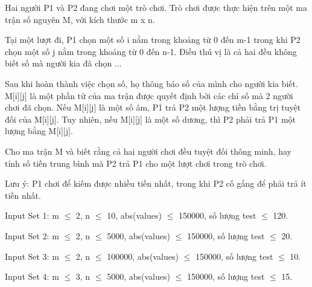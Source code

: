 Hai người P1 và P2 đang chơi một trò chơi. Trò chơi được thực hiện trên một ma trận số nguyên M, với kích thước m x n.  

   Tại một lượt đi, P1 chọn một số i nằm trong khoảng từ 0 đến m-1 trong khi P2 chọn một số j nằm trong khoảng từ 0 đến n-1. Điều thú vị là cả hai đều không biết số mà người kia đã chọn ...  

   Sau khi hoàn thành việc chọn số, họ thông báo số của mình cho người kia biết. M[i][j] là một phần tử của ma trận được quyết định bởi các chỉ số mà 2 người chơi đã chọn. Nếu M[i][j] là một số âm, P1 trả P2 một lượng tiền bằng trị tuyệt đối của M[i][j]. Tuy nhiên, nếu M[i][j] là một số dương, thì P2 phải trả P1 một lượng bằng M[i][j].  

   Cho ma trận M và biết rằng cả hai người chơi đều tuyệt đối thông minh, hay tính số tiền trung bình mà P2 trả P1 cho một lượt chơi trong trò chơi.  

   Lưu ý: P1 chơi để kiếm được nhiều tiền nhất, trong khi P2 cố gắng để phải trả ít tiền nhất.  

Input Set 1: m  $\le$  2, n  $\le$  10, abs(values)  $\le$  150000, số lượng test  $\le$  120.  

   Input Set 2: m  $\le$  2, n  $\le$  5000, abs(values)  $\le$  150000, số lượng test  $\le$  20.  

   Input Set 3: m  $\le$  2, n  $\le$  100000, abs(values)  $\le$  150000, số lượng test  $\le$  10.  

   Input Set 4: m  $\le$  3, n  $\le$  5000, abs(values)  $\le$  150000, số lượng test  $\le$  15.